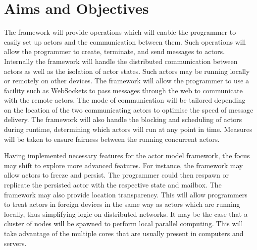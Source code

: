\documentclass[12pt]{report}
\begin{document}
\section{Aims and Objectives}
The framework will provide operations which will enable the programmer to easily set up actors and the communication between them. Such operations will allow the programmer to create, terminate, and send messages to actors. Internally the framework will handle the distributed communication between actors as well as the isolation of actor states. Such actors may be running locally or remotely on other devices. The framework will allow the programmer to use a facility such as WebSockets to pass messages through the web to communicate with the remote actors. The mode of communication will be tailored depending on the location of the two communicating actors to optimise the speed of message delivery. The framework will also handle the blocking and scheduling of actors during runtime, determining which actors will run at any point in time. Measures will be taken to ensure fairness between the running concurrent actors.

Having implemented necessary features for the actor model framework, the focus may shift to explore more advanced features. For instance, the framework may allow actors to freeze and persist. The programmer could then respawn or replicate the persisted actor with the respective state and mailbox. The framework may also provide location transparency. This will allow programmers to treat actors in foreign devices in the same way as actors which are running locally, thus simplifying logic on distributed networks. It may be the case that a cluster of nodes will be spawned to perform local parallel computing. This will take advantage of the multiple cores that are usually present in computers and servers.
\end{document}
